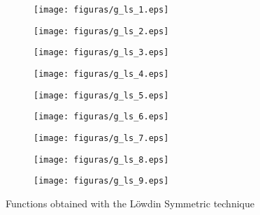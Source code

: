 \begin{figure}[H]
    \centering
    \begin{subfigure}[b]{0.3\linewidth}
        \texttt{[image: figuras/g\_ls\_1.eps]}
    \end{subfigure}
    \begin{subfigure}[b]{0.3\linewidth}
        \texttt{[image: figuras/g\_ls\_2.eps]}
    \end{subfigure}
    \begin{subfigure}[b]{0.3\linewidth}
        \texttt{[image: figuras/g\_ls\_3.eps]}
    \end{subfigure}
    \begin{subfigure}[b]{0.3\linewidth}
        \texttt{[image: figuras/g\_ls\_4.eps]}
    \end{subfigure}
    \begin{subfigure}[b]{0.3\linewidth}
        \texttt{[image: figuras/g\_ls\_5.eps]}
    \end{subfigure}
    \begin{subfigure}[b]{0.3\linewidth}
        \texttt{[image: figuras/g\_ls\_6.eps]}
    \end{subfigure}
    \begin{subfigure}[b]{0.3\linewidth}
        \texttt{[image: figuras/g\_ls\_7.eps]}
    \end{subfigure}
    \begin{subfigure}[b]{0.3\linewidth}
        \texttt{[image: figuras/g\_ls\_8.eps]}
    \end{subfigure}
    \begin{subfigure}[b]{0.3\linewidth}
        \texttt{[image: figuras/g\_ls\_9.eps]}
    \end{subfigure}
    \caption{Functions obtained with the Löwdin Symmetric technique}
    \label{fig:ls_gaussians}
\end{figure}
